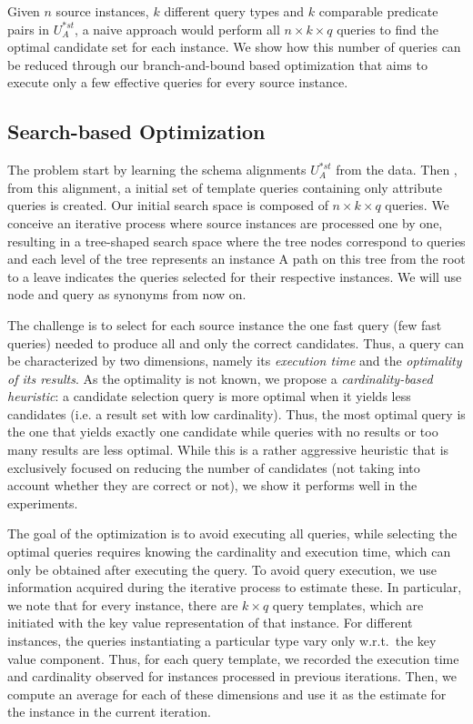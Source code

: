 Given $n$ source instances, $k$ different query types and $k$ comparable predicate pairs in $U^{*st}_A$, a naive approach would perform all $n \times k \times q$ queries to find the optimal candidate set for each instance. We show how this number of queries can be reduced through our branch-and-bound based optimization that aims to execute only a few effective queries for every source instance. 
 
\subsection{Search-based Optimization} 
The problem start by learning the schema alignments $U^{*st}_A$ from the data. Then , from this alignment, a initial set of template queries containing only attribute queries is created. Our initial search space is composed of $n \times k \times q$ queries. We conceive an iterative process where source instances are processed one by one, resulting in a tree-shaped search space where the tree nodes correspond to queries and each level of the tree represents an instance  A path on this tree from the root to a leave indicates the queries selected for their respective instances. We will use node and query as synonyms from now on.

The challenge is to select for each source instance the one fast query (few fast queries) needed to produce all and only the correct candidates. Thus, a query can be characterized by two dimensions, namely its \emph{execution time} and the \emph{optimality of its results}. As the optimality is not known, we propose a \emph{cardinality-based heuristic}: a candidate selection query is more optimal when it yields less candidates (i.e. a result set with low cardinality). Thus, the most optimal query is the one that yields exactly one candidate while queries with no results or too many results are less optimal. While this is a rather aggressive heuristic that is exclusively focused on reducing the number of candidates (not taking into account whether they are correct or not), we show it performs well in the experiments. 

The goal of the optimization is to avoid executing all queries, while selecting the optimal queries requires knowing the cardinality and execution time, which can only be obtained after executing the query. To avoid query execution, we use information acquired during the iterative process to estimate these. In particular, we note that for every instance, there are $k \times q$ query templates, which are initiated with the key value representation of that instance.  For different instances, the queries instantiating a particular type vary only w.r.t.~the key value component. Thus, for each query template, we recorded the execution time and cardinality observed for instances processed in previous iterations. Then, we compute an average for each of these dimensions and use it as the estimate for the instance in the current iteration. 
 

